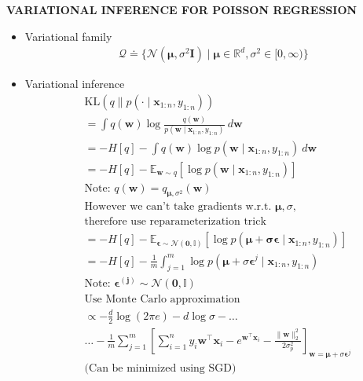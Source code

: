 \begin{whitebox}{\textbf{VARIATIONAL INFERENCE FOR POISSON REGRESSION}}
    \begin{itemize}
        \item Variational family
        \begin{align*}
            \mathcal{Q}\doteq\{\mathcal{N}(\bm{\mu},\sigma^2\bm{I})\mid \bm{\mu}\in\mathbb{R}^d,\sigma^2\in[0,\infty)\}
        \end{align*}
        \item Variational inference
        \begin{align*}
            &\mathrm{KL}(q\|p(\cdot\mid \bm{x}_{1:n},y_{1:n}))\\
            &=\int q(\bm{w})\log\frac{q(\bm{w})}{p(\bm{w}\mid \bm{x}_{1:n},y_{1:n})}\ d\bm{w}\\
            &=-H[q]-\int q(\bm{w})\log p(\bm{w}\mid \bm{x}_{1:n},y_{1:n})\ d\bm{w}\\
            &=-H[q]-\mathbb{E}_{\bm{w}\sim q}[\log p(\bm{w}\mid \bm{x}_{1:n},y_{1:n})]\\
            &\text{Note: $q(\bm{w})=q_{\bm{\mu},\sigma^2}(\bm{w})$}\\
            &\text{However we can't take gradients w.r.t. $\bm{\mu},\sigma$,}\\
            &\text{therefore use reparameterization trick}\\
            &=-H[q]-\mathbb{E}_{\bm{\epsilon}\sim \mathcal{N}(\bm{0},\mathbb{I})}[\log p(\bm{\mu+\sigma\bm{\epsilon}}\mid \bm{x}_{1:n},y_{1:n})]\\
            &=-H[q]-\frac{1}{m}\int_{j=1}^m\log p(\bm{\mu}+\sigma\bm{\epsilon}^{j}\mid \bm{x}_{1:n},y_{1:n})\\
            &\text{Note: $\bm{\epsilon^{(j)}}\sim\mathcal{N}(\bm{0},\mathbb{I})$}\\
            &\text{Use Monte Carlo approximation}\\
            &\propto -\frac{d}{2}\log(2\pi e)-d\log\sigma-\dots\\
            &\dots -\frac{1}{m}\sum_{j=1}^m\left[\sum_{i=1}^n y_i\bm{w}^\top\bm{x}_i-e^{\bm{w}^\top\bm{x}_i}-\frac{\|\bm{w}\|_2^2}{2\sigma_p^2}\right]_{\bm{w}=\bm{\mu}+\sigma\bm{\epsilon}^{j}}\\
            &\text{(Can be minimized using SGD)}
        \end{align*}
    \end{itemize}
\end{whitebox}